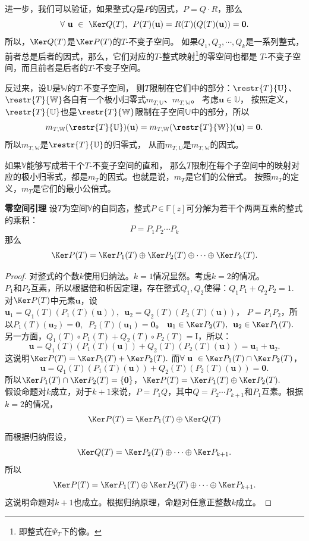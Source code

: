 \documentclass[12pt,UTF8,fontset=none]{ctexbook}
\begin{document}
进一步，我们可以验证，如果整式$Q$是$P$的因式，$P = Q\cdot R$，那么
$$ \forall \,\, \mathbf{u} \,\,\in \,\, \Ker Q(T),\,\,\, P(T)(\mathbf{u}) = R(T)(Q(T)(\mathbf{u})) = \mathbf{0}.$$
所以，$\Ker Q(T)$是$\Ker P(T)$的$T$-不变子空间。
如果$Q_1, Q_2, \cdots ,Q_k$是一系列整式，前者总是后者的因式，那么，它们对应的$T$-整式映射\footnote{即整式在$\Psi_T$下的像。}的零空间也都是
$T$-不变子空间，而且前者是后者的$T$-不变子空间。

反过来，设$\mathbb{U}$是$\mathbb{W}$的$T$-不变子空间，
则$T$限制在它们中的部分：$\restr{T}{\mathbb{U}}$、$\restr{T}{\mathbb{W}}$各自有一个极小归零式$m_{T,\mathbb{U}}$、$m_{T,\mathbb{W}}$。
考虑$\mathbf{u} \in \mathbb{U}$，
按照定义，$\restr{T}{\mathbb{U}}$也是$\restr{T}{\mathbb{W}}$限制在子空间$\mathbb{U}$中的部分，所以
$$m_{T,\mathbb{W}}(\restr{T}{\mathbb{U}})(\mathbf{u}) = m_{T,\mathbb{W}}(\restr{T}{\mathbb{W}})(\mathbf{u}) = \mathbf{0}.$$
所以$m_{T,\mathbb{W}}$是$\restr{T}{\mathbb{U}}$的归零式，
从而$m_{T,\mathbb{U}}$是$m_{T,\mathbb{W}}$的因式。

如果$\mathbb{V}$能够写成若干个$T$-不变子空间的直和，
那么$T$限制在每个子空间中的映射对应的极小归零式，都是$m_T$的因式。也就是说，$m_T$是它们的公倍式。
按照$m_T$的定义，$m_T$是它们的最小公倍式。

\begin{pp}\textbf{零空间引理}\label{pp:6_4}
    设$T$为空间$\mathbb{V}$的自同态，整式$P\in\mathbb{F}[z]$可分解为若干个两两互素的整式的乘积：
    $$ P = P_1 P_2\cdots P_k$$
    那么
    $$ \Ker P(T) = \Ker P_1(T) \oplus \Ker P_2(T) \oplus \cdots \oplus \Ker P_k(T). $$
\end{pp}
\begin{proof} %
    对整式的个数$k$使用归纳法。$k=1$情况显然。考虑$k=2$的情况。\\
    $P_1$和$P_2$互素，所以根据倍和析因定理，存在整式$Q_1, Q_2$使得：$Q_1 P_1 + Q_2 P_2 = 1.$\\
    对$\Ker P(T)$中元素$\mathbf{u}$，设$\mathbf{u}_1 = Q_1(T)(P_1(T)(\mathbf{u})), \,\,\, \mathbf{u}_2 = Q_2(T)(P_2(T)(\mathbf{u}))$，
    $P = P_1 P_2$，所以$P_1(T)(\mathbf{u}_2) = \mathbf{0}, \,\,\, P_2(T)(\mathbf{u}_1) = \mathbf{0}$。
    $\mathbf{u}_1 \in \Ker P_2(T), \,\,\, \mathbf{u}_2 \in \Ker P_1(T).$
    另一方面，$Q_1(T) \circ P_1(T) + Q_2(T) \circ P_2(T) = \mathrm{I}$，所以：
    $$ \mathbf{u} = Q_1(T)(P_1(T)(\mathbf{u})) + Q_2(T)(P_2(T)(\mathbf{u})) = \mathbf{u}_1 + \mathbf{u}_2.$$
    这说明$\Ker P(T) = \Ker P_1(T) + \Ker P_2(T).$
    而$\forall \,\, \mathbf{u} \,\, \in \Ker P_1(T) \cap \Ker P_2(T)$，
    $$ \mathbf{u} = Q_1(T)(P_1(T)(\mathbf{u})) + Q_2(T)(P_2(T)(\mathbf{u})) = \mathbf{0}. $$
    所以$\Ker P_1(T) \cap \Ker P_2(T) = \{\mathbf{0}\}$，$\Ker P(T) = \Ker P_1(T) \oplus \Ker P_2(T).$\\
    假设命题对$k$成立，对于$k+1$来说，$P = P_1 Q$，其中$Q = P_2 \cdots P_{k+1}$和$P_1$互素。根据$k=2$的情况， 
    $$ \Ker P(T) = \Ker P_1(T) \oplus \Ker Q(T)$$
    而根据归纳假设，
    $$ \Ker Q(T) = \Ker P_2(T) \oplus \cdots \oplus \Ker P_{k+1}.$$
    所以
    $$ \Ker P(T) = \Ker P_1(T) \oplus \Ker P_2(T) \oplus \cdots \oplus \Ker P_{k+1}.$$
    这说明命题对$k+1$也成立。根据归纳原理，命题对任意正整数$k$成立。
    
\end{proof}
\end{document}
